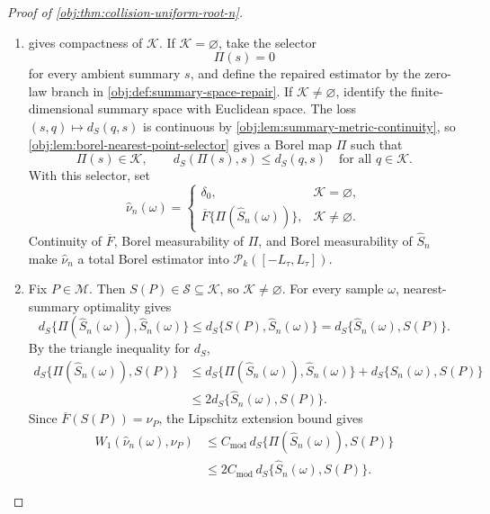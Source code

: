 \begin{proof}[Proof of \cref{obj:thm:collision-uniform-root-n}]
\begin{enumerate}
\item {} gives compactness of
\(\mathcal K\).  If \(\mathcal K=\varnothing\), take the selector
\[
\Pi(s)=0
\]
for every ambient summary \(s\), and define the repaired estimator by the
zero-law branch in \cref{obj:def:summary-space-repair}.  If
\(\mathcal K\ne\varnothing\), identify the finite-dimensional summary space
with Euclidean space.  The loss \((s,q)\mapsto d_S(q,s)\) is continuous by
\cref{obj:lem:summary-metric-continuity}, so
\cref{obj:lem:borel-nearest-point-selector} gives a Borel map \(\Pi\) such
that
\[
\Pi(s)\in\mathcal K,
\qquad
d_S(\Pi(s),s)\le d_S(q,s)
\quad\text{for all }q\in\mathcal K .
\]
With this selector, set
\[
\widehat\nu_n(\omega)
=
\begin{cases}
\delta_0, & \mathcal K=\varnothing,\\
\overline F\{\Pi(\widehat S_n(\omega))\}, & \mathcal K\ne\varnothing .
\end{cases}
\]
Continuity of \(\overline F\), Borel measurability of \(\Pi\), and Borel
measurability of \(\widehat S_n\) make \(\widehat\nu_n\) a total Borel
estimator into \(\mathcal P_k([-L_\tau,L_\tau])\).%

\item Fix \(P\in\mathcal M\).  Then \(S(P)\in\mathscr S\subseteq\mathcal K\),
so \(\mathcal K\ne\varnothing\).  For every sample \(\omega\), nearest-summary
optimality gives
\[
d_S\{\Pi(\widehat S_n(\omega)),\widehat S_n(\omega)\}
\le
d_S\{S(P),\widehat S_n(\omega)\}
=
d_S\{\widehat S_n(\omega),S(P)\}.
\]
By the triangle inequality for \(d_S\),
\[
\begin{aligned}
d_S\{\Pi(\widehat S_n(\omega)),S(P)\}
&\le
d_S\{\Pi(\widehat S_n(\omega)),\widehat S_n(\omega)\}
+d_S\{\widehat S_n(\omega),S(P)\}  \\
&\le
2d_S\{\widehat S_n(\omega),S(P)\}.
\end{aligned}
\]
Since \(\overline F(S(P))=\nu_P\), the Lipschitz extension bound gives
\[
\begin{aligned}
W_1(\widehat\nu_n(\omega),\nu_P)
&\le
C_{\mathrm{mod}}\,
d_S\{\Pi(\widehat S_n(\omega)),S(P)\}  \\
&\le
2C_{\mathrm{mod}}\,d_S\{\widehat S_n(\omega),S(P)\}.
\end{aligned}
\]%


\end{enumerate}
\end{proof}
